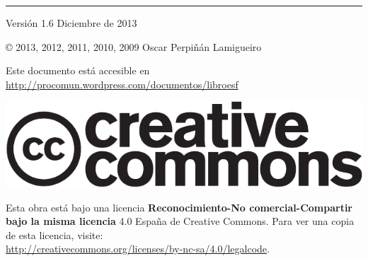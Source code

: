 
\chapterprecis{\vfill{}
}
\rule[.5ex]{\linewidth}{1pt} 

Versión 1.6 Diciembre de 2013

© 2013, 2012, 2011, 2010, 2009 Oscar Perpiñán Lamigueiro

Este documento está accesible en \url{http://procomun.wordpress.com/documentos/libroesf}

\begin{center}
\includegraphics[scale=0.5]{../figs/cc-logo}
\par\end{center}

Esta obra está bajo una licencia \textbf{Reconocimiento-No comercial-Compartir
bajo la misma licencia} 4.0 España de Creative Commons. Para ver una
copia de esta licencia, visite:\\
 \url{http://creativecommons.org/licenses/by-nc-sa/4.0/legalcode}.

